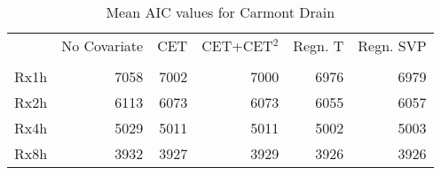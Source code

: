 \begin{table}
\caption{Mean AIC values for Carmont Drain}
\label{tab:aic}
\begin{tabular}{lrrrrr}
\toprule
 & No Covariate & CET & CET+CET$^2$ & Regn. T & Regn. SVP \\
 &  &  &  &  &  \\
\midrule
Rx1h & 7058 & 7002 & 7000 & 6976 & 6979 \\
Rx2h & 6113 & 6073 & 6073 & 6055 & 6057 \\
Rx4h & 5029 & 5011 & 5011 & 5002 & 5003 \\
Rx8h & 3932 & 3927 & 3929 & 3926 & 3926 \\
\bottomrule
\end{tabular}
\end{table}
